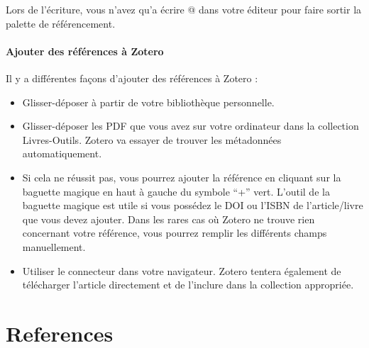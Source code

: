 \documentclass[
  letterpaper,
  DIV=11,
  numbers=noendperiod]{scrreprt}
\providecommand{\tightlist}{%
  \setlength{\itemsep}{0pt}\setlength{\parskip}{0pt}}\usepackage{longtable,booktabs,array}
\begin{document}
Lors de l'écriture, vous n'avez qu'a écrire @ dans votre éditeur pour
faire sortir la palette de référencement.

\subsubsection{Ajouter des références à
Zotero}\label{ajouter-des-ruxe9fuxe9rences-uxe0-zotero}

Il y a différentes façons d'ajouter des références à Zotero :

\begin{itemize}
\tightlist
\item
  Glisser-déposer à partir de votre bibliothèque personnelle.
\item
  Glisser-déposer les PDF que vous avez sur votre ordinateur dans la
  collection Livres-Outils. Zotero va essayer de trouver les métadonnées
  automatiquement.
\item
  Si cela ne réussit pas, vous pourrez ajouter la référence en cliquant
  sur la baguette magique en haut à gauche du symbole ``+'' vert.
  L'outil de la baguette magique est utile si vous possédez le DOI ou
  l'ISBN de l'article/livre que vous devez ajouter. Dans les rares cas
  où Zotero ne trouve rien concernant votre référence, vous pourrez
  remplir les différents champs manuellement.
\item
  Utiliser le connecteur dans votre navigateur. Zotero tentera également
  de télécharger l'article directement et de l'inclure dans la
  collection appropriée.
\end{itemize}


\chapter*{References}\label{references}

\end{document}
